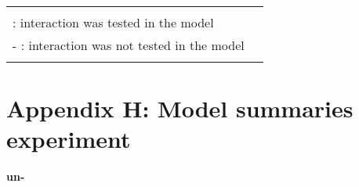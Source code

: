 \begin{table}
{\begin{tabular} {llrrrrr}
	\midrule \\
	\multicolumn{6}{l}{\small \checkmark \hspace*{0.2cm}: interaction was tested in the model} & \\			
	\multicolumn{6}{l}{\small - \hspace*{0.45cm}: interaction was not tested in the model} & \\			
	 
		\lspbottomrule 
			\end{tabular}
}

\vspace*{-0.5cm}
\end{table}


\clearpage


\section*{Appendix H: Model summaries experiment} \label{Appendix H: Model Summaries Experiment}

\textbf{{un-}}

\vspace*{-0.3cm}

